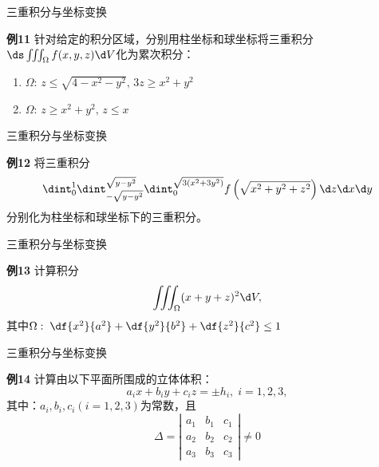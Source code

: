\begin{frame}{三重积分与坐标变换}
	\linespread{1.5}\pause
	\begin{exampleblock}{{\bf 例11}\hfill}
		针对给定的积分区域，分别用柱坐标和球坐标将三重积分$\ds\iiint_{\Omega}
		f(x,y,z)\d V$化为累次积分：\pause
		\begin{enumerate}
		  \item $\Omega:\,z\leq\sqrt{4-x^2-y^2},\,3z\geq x^2+y^2$\pause 
		  \item $\Omega:\, z\geq x^2+y^2,\,z\leq x$
		\end{enumerate}
	\end{exampleblock}
\end{frame}

\begin{frame}{三重积分与坐标变换}
	\linespread{1.2}
	\begin{exampleblock}{{\bf 例12}\hfill}
		将三重积分
		$$\dint_0^1\dint_{-\sqrt{y-y^2}}^{\sqrt{y-y^2}}
		\dint_0^{\sqrt{3(x^2+3y^2)}}f\left(
		\sqrt{x^2+y^2+z^2}\right)\d z\d x\d y$$
		分别化为柱坐标和球坐标下的三重积分。
	\end{exampleblock}
\end{frame}

\begin{frame}{三重积分与坐标变换}
	\linespread{1.2}
	\begin{exampleblock}{{\bf 例13}\hfill}
		计算积分
		$$\iiint_{\Omega}(x+y+z)^2\d V,$$
		其中$\Omega:\;\df{x^2}{a^2}+\df{y^2}{b^2}+\df{z^2}{c^2}\leq 1$
	\end{exampleblock}
\end{frame}

\begin{frame}{三重积分与坐标变换}
	\linespread{1.2}
	\begin{exampleblock}{{\bf 例14}\hfill}
		计算由以下平面所围成的立体体积：
		$$a_ix+b_iy+c_iz=\pm h_i,\;i=1,2,3,$$
		其中：$a_i,b_i,c_i(i=1,2,3)$为常数，且
		$$\Delta=\left|\begin{array}{ccc}
		a_1 & b_1 & c_1\\ a_2 & b_2 & c_2 \\ a_3 & b_3 & c_3
		\end{array}\right|\ne 0$$
	\end{exampleblock}
\end{frame}

